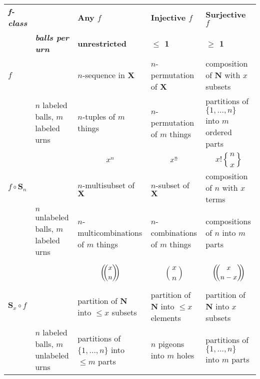 \documentclass[]{article}
\newcommand{\fallingfactorial}[1]{%
  ^{\mspace{1mu}\underline{#1\mspace{-2mu}}\mspace{2mu}}%
}
\newcommand{\stirlingii}{\genfrac{\{}{\}}{0pt}{}}
\newcommand{\multichoose}[2]{\bigg(\!\!\dbinom{#1}{#2}\!\!\bigg)}
\begin{document}
\begin{tabular}{ | p{.6in} | p{0.9in} || p{1.7in} | p{1.7in} | p{1.7in} |  }

\hline


\rowcolor{Gray} 
\textbf{\em{f}-class}
& 
& \textbf{Any $f$} 
&  \textbf{Injective $f$} 
& \textbf{Surjective $f$} 
\\

& \textbf{\em{balls per urn}} 
& \textbf{unrestricted} 
& \textbf{$\leq$ 1} 
& \textbf{$\geq$ 1} 
\\

\hline


\rowcolor{Gray} 
$f$
&
& $n$-sequence in $\mathbf{X}$
& $n$-permutation of $\mathbf{X}$
& composition of $\mathbf{N}$ with $x$ subsets
\\

& $n$ labeled balls, $m$ labeled urns
& $n$-tuples of $m$ things
& $n$-permutation of $m$ things
& partitions of $\{1,\ldots,n\}$ into $m$ ordered parts
\\

&
& $$x^n$$
& $$x\fallingfactorial{n}$$
& $$x! \stirlingii{n}{x}$$
\\

\hline


\rowcolor{Gray} 
$f \circ \mathbf{S}_n$
&
& $n$-multisubset of $\mathbf{X}$ 
& $n$-subset of $\mathbf{X}$ 
& composition of $n$ with $x$ terms
\\

& $n$ unlabeled balls, $m$ labeled urns
& $n$-multicombinations of $m$ things
& $n$-combinations of $m$ things
& compositions of $n$ into $m$ parts
\\

&
& $$\multichoose{x}{n}$$
& $$\binom{x}{n}$$
& $$\multichoose{x}{n-x}$$
\\

\hline


\rowcolor{Gray} 
$\mathbf{S}_x \circ f$
&
& partition of $\mathbf{N}$ into $\leq x$ subsets
& partition of $\mathbf{N}$ into $\leq x$ elements
& partition of $\mathbf{N}$ into $x$ subsets
\\

& $n$ labeled balls, $m$ unlabeled urns
& partitions of $\{1,\ldots,n\}$ into $\leq m$ parts
& $n$ pigeons into $m$ holes
& partitions of $\{1,\ldots,n\}$ into $m$ parts
\\


\end{tabular}
\end{document}
